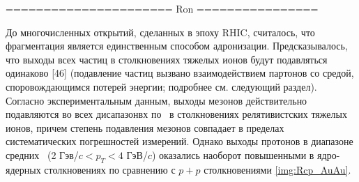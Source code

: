 \begin{comment}
	\textbf{Кластерная модель} [22]-[26]. Модель начинается с непертурбативного расщепления глюонов g → qq после партонного потока. Комбинации цвет-синглет qq имеют меньшие массы и универсальный спектр из-за свойства предконфайнмента [27, 28] ливня (рис. 3 [29]). Предполагается, что эти синглетно-цветовые комбинации образуют кластеры, которые в большинстве случаев подвергаются простому изотропному распаду на пары адронов, выбранные в соответствии с плотностью состояний с соответствующими квантовыми числами [23]. Эта модель имеет мало параметров и естественный механизм генерации поперечных импульсов и подавления рождения тяжелых частиц при адронизации. Однако у него есть проблемы с распадом очень массивных кластеров и с адекватным подавлением рождения барионов и тяжелых кварков.
	
	\textbf{Струнная модель} Эта модель основана на динамике релятивистской струны, представляющей собой цветовой поток, натянутый между исходными $q\bar{q}$. Струна создает линейный потенциал удержания и закон площадей для матричных элементов:
	$$|M(q\bar{q} \rightarrow h_1 ... h_n)|^2 \sim e^{-b A}$$
	где $A$ — заметаемая область пространства-времени (рис. 4). Струна распадается на адроны за счет образования пары $q\bar{q}$ в ее интенсивном цветовом поле. Глюоны, образующиеся в потоке партонов, вызывают «перегибы» на струне. Модель имеет дополнительные параметры для распределения поперечного импульса и подавления тяжелых частиц. У нее есть некоторые проблемы с описанием рождения барионов, но меньше, чем у кластерной модели.
	
	\textbf{Модель UCLA} [35]-[37] представляет собой вариант струнной модели JETSET, в которой приведенный выше закон площадей для матричных элементов рассматривается более серьезно и используется для определения относительных скоростей образования различных видов адронов. Это приводит к подавлению тяжелых частиц без дополнительных параметров, причем квадрат массы адрона пропорционален его площади в пространстве-времени. В настоящее время модель по-прежнему использует дополнительные параметры для $p_T$-спектров и снова имеет некоторые проблемы с описанием образования барионов.
\end{comment}

====================== Ron ================

До многочисленных открытий, сделанных в эпоху RHIC, считалось, что фрагментация является единственным способом адронизации. Предсказывалось, что выходы всех частиц в столкновениях тяжелых ионов будут подавляться одинаково [46] (подавление частиц вызвано взаимодействием партонов со средой, споровождающимся потерей энергии; подробнее см. следующий раздел). 
Согласно экспериментальным данным, выходы мезонов действительно подавляются во всех дисапазонвх по \pt \ в столкновениях релятивистских тяжелых ионов, причем степень подавления мезонов совпадает в пределах систематических погрешностей измерений. 
Однако выходы протонов в диапазоне средних \pt \ (2 Гэв/$c < p_T < 4$ ГэВ/$c$) оказались наоборот повышенными в ядро-ядерных столкновениях по сравнению с $p+p$ столкновениями \ref{img:Rcp_AuAu}.

